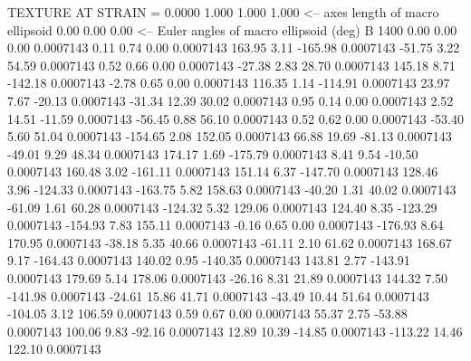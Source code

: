 TEXTURE AT STRAIN =    0.0000
   1.000   1.000   1.000  <-- axes length of macro ellipsoid
    0.00    0.00    0.00  <-- Euler angles of macro ellipsoid (deg)
B      1400
        0.00        0.00        0.00     0.0007143
        0.11        0.74        0.00     0.0007143
      163.95        3.11     -165.98     0.0007143
      -51.75        3.22       54.59     0.0007143
        0.52        0.66        0.00     0.0007143
      -27.38        2.83       28.70     0.0007143
      145.18        8.71     -142.18     0.0007143
       -2.78        0.65        0.00     0.0007143
      116.35        1.14     -114.91     0.0007143
       23.97        7.67      -20.13     0.0007143
      -31.34       12.39       30.02     0.0007143
        0.95        0.14        0.00     0.0007143
        2.52       14.51      -11.59     0.0007143
      -56.45        0.88       56.10     0.0007143
        0.52        0.62        0.00     0.0007143
      -53.40        5.60       51.04     0.0007143
     -154.65        2.08      152.05     0.0007143
       66.88       19.69      -81.13     0.0007143
      -49.01        9.29       48.34     0.0007143
      174.17        1.69     -175.79     0.0007143
        8.41        9.54      -10.50     0.0007143
      160.48        3.02     -161.11     0.0007143
      151.14        6.37     -147.70     0.0007143
      128.46        3.96     -124.33     0.0007143
     -163.75        5.82      158.63     0.0007143
      -40.20        1.31       40.02     0.0007143
      -61.09        1.61       60.28     0.0007143
     -124.32        5.32      129.06     0.0007143
      124.40        8.35     -123.29     0.0007143
     -154.93        7.83      155.11     0.0007143
       -0.16        0.65        0.00     0.0007143
     -176.93        8.64      170.95     0.0007143
      -38.18        5.35       40.66     0.0007143
      -61.11        2.10       61.62     0.0007143
      168.67        9.17     -164.43     0.0007143
      140.02        0.95     -140.35     0.0007143
      143.81        2.77     -143.91     0.0007143
      179.69        5.14      178.06     0.0007143
      -26.16        8.31       21.89     0.0007143
      144.32        7.50     -141.98     0.0007143
      -24.61       15.86       41.71     0.0007143
      -43.49       10.44       51.64     0.0007143
     -104.05        3.12      106.59     0.0007143
        0.59        0.67        0.00     0.0007143
       55.37        2.75      -53.88     0.0007143
      100.06        9.83      -92.16     0.0007143
       12.89       10.39      -14.85     0.0007143
     -113.22       14.46      122.10     0.0007143
